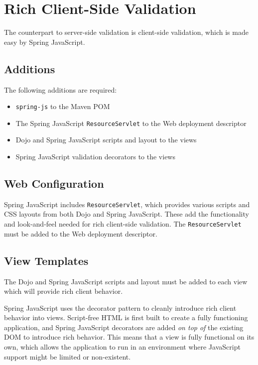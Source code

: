 \documentclass{article}
\begin{document}
\pagebreak
\section{Rich Client-Side Validation}

The counterpart to server-side validation is client-side validation, which is made easy by Spring JavaScript.

\subsection{Additions}

The following additions are required:

\begin{itemize}
\item \texttt{spring-js} to the Maven POM
\item The Spring JavaScript \texttt{ResourceServlet} to the Web deployment descriptor
\item Dojo and Spring JavaScript scripts and layout to the views
\item Spring JavaScript validation decorators to the views
\end{itemize}

\subsection{Web Configuration}

Spring JavaScript includes \texttt{ResourceServlet}, which provides various scripts and CSS layouts from both Dojo and Spring JavaScript.  These add the functionality and look-and-feel needed for rich client-side validation.  The \texttt{ResourceServlet} must be added to the Web deployment descriptor.



\subsection{View Templates}

The Dojo and Spring JavaScript scripts and layout must be added to each view which will provide rich client behavior.



Spring JavaScript uses the decorator pattern to cleanly introduce rich client behavior into views.  Script-free HTML is first built to create a fully functioning application, and Spring JavaScript decorators are added \emph{on top of} the existing DOM to introduce rich behavior.  This means that a view is fully functional on its own, which allows the application to run in an environment where JavaScript support might be limited or non-existent.
\end{document}
